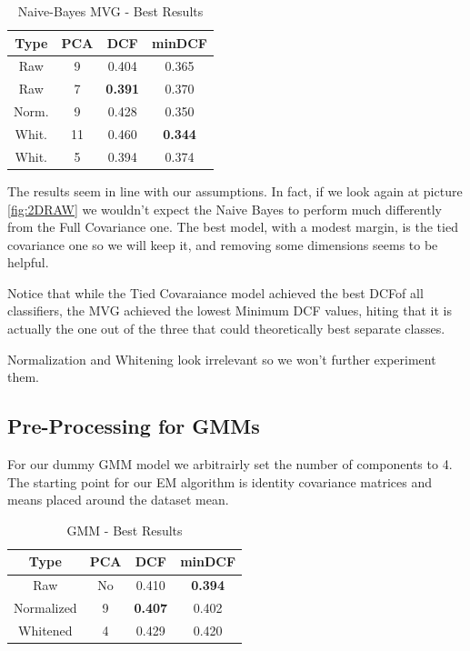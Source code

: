 \documentclass[12pt, twocolumn]{article}
\begin{document}
\begin{table}[H]
    \centering
        \begin{tabular}{||c|c|c|c||}
            \hline
            Type & PCA & DCF & minDCF \\
            \hline
            \hline
            Raw   & 9  & 0.404 &  0.365 \\
            Raw   & 7  & {\bf 0.391} &  0.370 \\
            Norm. & 9  & 0.428 &  0.350 \\
            Whit. & 11 & 0.460 &  {\bf 0.344} \\
            Whit. & 5  & 0.394 &  0.374 \\
            \hline
    \end{tabular}
    \caption{Naive-Bayes MVG - Best Results}
    \label{naivetab}
\end{table}

The results seem in line with our assumptions.
In fact, if  we look again at picture \ref{fig:2DRAW} we wouldn't expect the Naive Bayes to perform much differently from the Full Covariance one.
The best model, with a modest margin, is the tied covariance one so we will keep it,
and removing some dimensions seems to be helpful.

Notice that while the Tied Covaraiance model achieved the best DCF\footnotemark of all classifiers,
the MVG achieved the lowest Minimum DCF values, hiting that it is actually the one out of the three that could theoretically best separate classes.

Normalization and Whitening look irrelevant so we won't further experiment them.

\subsection{Pre-Processing for GMMs}

For our dummy GMM model we arbitrairly set the number of components to 4.
The starting point for our EM algorithm is identity covariance matrices and means placed around the dataset mean.

\begin{table}[H]
    \centering
        \begin{tabular}{||c|c|c|c||}
            \hline
            Type & PCA & DCF & minDCF \\
            \hline
            \hline
            Raw & No & 0.410 & {\bf 0.394}  \\
            Normalized &  9 & {\bf 0.407} & 0.402 \\
            Whitened & 4 & 0.429 & 0.420 \\
            \hline
    \end{tabular}
    \caption{GMM - Best Results}
    \label{tab:gmmresults}
\end{table}
\end{document}
